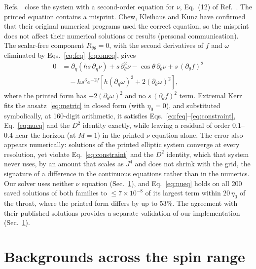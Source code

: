 \documentclass[twocolumn,floatfix,aps,prd,superscriptaddress,nofootinbib]{revtex4-2}
\begin{document}
Refs.~\cite{kleihaus_kunz2014,chew2016} close the system with a second-order equation for $\nu$, Eq.~(12) of Ref.~\cite{chew2016}. The printed equation contains a misprint. Chew, Kleihaus and Kunz have confirmed that their original numerical programs used the correct equation, so the misprint does not affect their numerical solutions or results (personal communication). The scalar-free component $R_{\theta\theta}=0$, with the second derivatives of $f$ and $\omega$ eliminated by Eqs.~\eqref{eq:feq}--\eqref{eq:omeq}, gives
\begin{equation}
\begin{split}
0&=\partial_\eta\!\left(h s\,\partial_\eta\nu\right)+s\,\partial_\theta^2\nu-\cos\theta\,\partial_\theta\nu+s\,(\partial_\theta f)^2\\
&\quad-h s^3 e^{-2f}\left[h(\partial_\eta\omega)^2+2(\partial_\theta\omega)^2\right],
\end{split}
\label{eq:nueq}
\end{equation}
where the printed form has $-2(\partial_\theta\omega)^2$ and no $s\,(\partial_\theta f)^2$ term. Extremal Kerr fits the ansatz~\eqref{eq:metric} in closed form (with $\eta_0=0$), and substituted symbolically, at 160-digit arithmetic, it satisfies Eqs.~\eqref{eq:feq}--\eqref{eq:constraint}, Eq.~\eqref{eq:nueq} and the $D^2$ identity exactly, while leaving a residual of order $0.1$--$0.4$ near the horizon (at $M=1$) in the printed $\nu$ equation alone. The error also appears numerically: solutions of the printed elliptic system converge at every resolution, yet violate Eq.~\eqref{eq:constraint} and the $D^2$ identity, which that system never uses, by an amount that scales as $J^4$ and does not shrink with the grid, the signature of a difference in the continuous equations rather than in the numerics. Our solver uses neither $\nu$ equation (Sec.~\ref{sec:solver}), and Eq.~\eqref{eq:nueq} holds on all 200 saved solutions of both families to $\le7\times10^{-8}$ of its largest term within $20\,\eta_0$ of the throat, where the printed form differs by up to $53\%$. The agreement with their published solutions provides a separate validation of our implementation (Sec.~\ref{sec:solver}).

\section{Backgrounds across the spin range}
\label{sec:solver}
\end{document}
